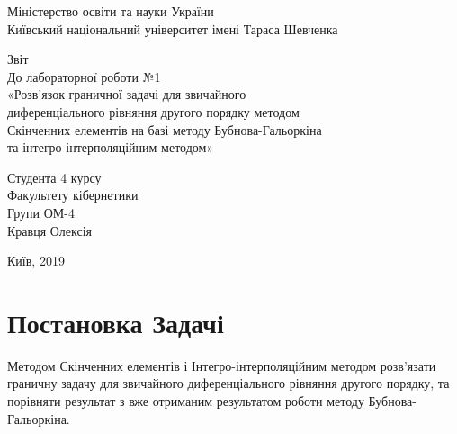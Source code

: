 \documentclass[14pt,a4paper]{scrartcl}
\begin{document}
	\begin{titlepage}
		\begin{center}
			\small{Міністерство освіти та науки України}\\
			\small{Київський національний університет імені Тараса Шевченка}\\
		\end{center}
			\vspace{15em}
		\begin{center}
			\large{Звіт}\\
			\large{До лабораторної роботи №1}\\
			\large{«Розв’язок граничної задачі для звичайного}\\
			\large{диференціального рівняння  другого порядку методом}\\
			\large{Скінченних елементів на базі методу Бубнова-Гальоркіна}\\
			\large{та інтегро-інтерполяційним методом»}\\			
		\end{center}
			
		\vspace{10em}
		

	
		\begin{flushright}
			Студента 4 курсу\\
			Факультету кібернетики\\
			Групи ОМ-4\\
			Кравця Олексія\\
			
		\end{flushright}
		
		\vspace{\fill}

		
		\begin{center}
			\small{Київ, 2019}
		\end{center}
	
	\end{titlepage}


	\newpage

	\section{Постановка Задачі}
	Методом Скінченних елементів і Інтегро-інтерполяційним методом розв'язати граничну задачу для звичайного диференціального рівняння другого порядку, та порівняти результат з вже отриманим результатом роботи методу Бубнова-Гальоркіна.
\end{document}
